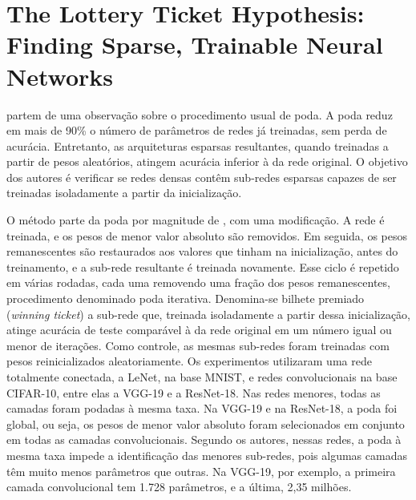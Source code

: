 \section{The Lottery Ticket Hypothesis: Finding Sparse, Trainable Neural Networks}\label{sec:frankle2019}

 partem de uma observação sobre o procedimento usual de poda. A poda
reduz em mais de 90\% o número de parâmetros de redes já treinadas, sem perda de acurácia.
Entretanto, as arquiteturas esparsas resultantes, quando treinadas a partir de pesos
aleatórios, atingem acurácia inferior à da rede original. O objetivo dos autores é verificar se
redes densas contêm sub-redes esparsas capazes de ser treinadas isoladamente a partir da
inicialização.

O método parte da poda por magnitude de , com uma modificação. A rede é
treinada, e os pesos de menor valor absoluto são removidos. Em seguida, os pesos remanescentes
são restaurados aos valores que tinham na inicialização, antes do treinamento, e a sub-rede
resultante é treinada novamente. Esse ciclo é repetido em várias rodadas, cada uma removendo
uma fração dos pesos remanescentes, procedimento denominado poda iterativa. Denomina-se
bilhete premiado (\textit{winning ticket}) a sub-rede que, treinada isoladamente a partir dessa
inicialização, atinge acurácia de teste comparável à da rede original em um número igual ou
menor de iterações. Como controle, as mesmas sub-redes foram treinadas com pesos reinicializados
aleatoriamente. Os experimentos utilizaram uma rede totalmente conectada, a LeNet, na base
MNIST, e redes convolucionais na base CIFAR-10, entre elas a VGG-19 e a ResNet-18. Nas redes
menores, todas as camadas foram podadas à mesma taxa. Na VGG-19 e na ResNet-18, a poda foi
global, ou seja, os pesos de menor valor absoluto foram selecionados em conjunto em todas as
camadas convolucionais. Segundo os autores, nessas redes, a poda à mesma taxa impede a
identificação das menores sub-redes, pois algumas camadas têm muito menos parâmetros que
outras. Na VGG-19, por exemplo, a primeira camada convolucional tem 1.728 parâmetros, e a
última, 2,35 milhões.

